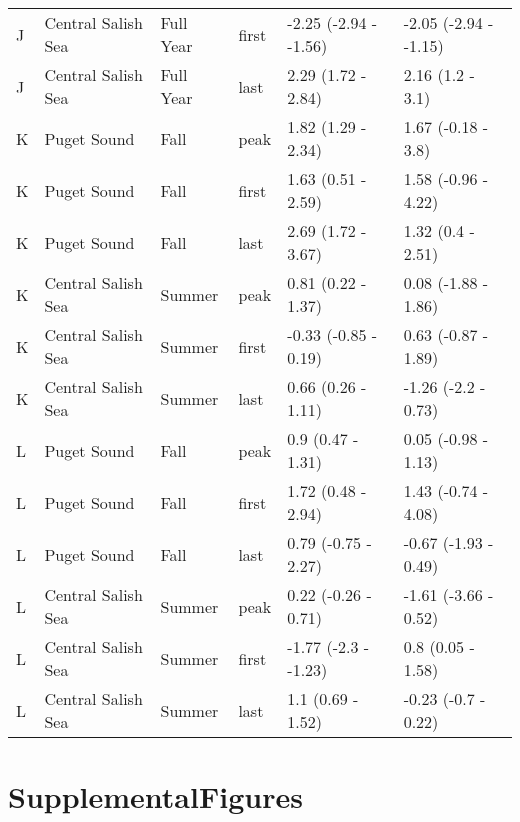 \documentclass{article}
\begin{document}
\begin{table}[ht]
\begin{tabular}{|p{}|p{}|p{}|p{}|p{}|p{}|}
  J & Central Salish Sea & Full Year & first & -2.25 (-2.94 - -1.56) & -2.05 (-2.94 - -1.15) \\ 
  J & Central Salish Sea & Full Year & last & 2.29 (1.72 - 2.84) & 2.16 (1.2 - 3.1) \\ 
   \hline
K & Puget Sound & Fall & peak & 1.82 (1.29 - 2.34) & 1.67 (-0.18 - 3.8) \\ 
  K & Puget Sound & Fall & first & 1.63 (0.51 - 2.59) & 1.58 (-0.96 - 4.22) \\ 
  K & Puget Sound & Fall & last & 2.69 (1.72 - 3.67) & 1.32 (0.4 - 2.51) \\ 
   \hline
K & Central Salish Sea & Summer & peak & 0.81 (0.22 - 1.37) & 0.08 (-1.88 - 1.86) \\ 
  K & Central Salish Sea & Summer & first & -0.33 (-0.85 - 0.19) & 0.63 (-0.87 - 1.89) \\ 
  K & Central Salish Sea & Summer & last & 0.66 (0.26 - 1.11) & -1.26 (-2.2 - 0.73) \\ 
   \hline
L & Puget Sound & Fall & peak & 0.9 (0.47 - 1.31) & 0.05 (-0.98 - 1.13) \\ 
  L & Puget Sound & Fall & first & 1.72 (0.48 - 2.94) & 1.43 (-0.74 - 4.08) \\ 
  L & Puget Sound & Fall & last & 0.79 (-0.75 - 2.27) & -0.67 (-1.93 - 0.49) \\ 
   \hline
L & Central Salish Sea & Summer & peak & 0.22 (-0.26 - 0.71) & -1.61 (-3.66 - 0.52) \\ 
  L & Central Salish Sea & Summer & first & -1.77 (-2.3 - -1.23) & 0.8 (0.05 - 1.58) \\ 
  L & Central Salish Sea & Summer & last & 1.1 (0.69 - 1.52) & -0.23 (-0.7 - 0.22) \\ 
   \hline
\end{tabular}
\endgroup
\end{table}\section* {SupplementalFigures}

  
\end{document}
